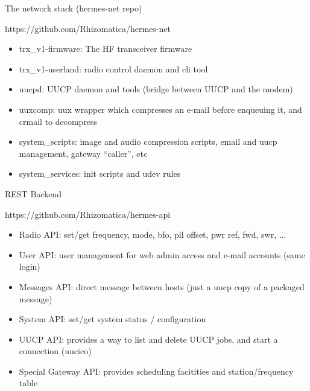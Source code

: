 \documentclass[aspectratio=169,xcolor={x11names,svgnames,dvipsnames}]{beamer}
\begin{document}
\begin{frame}{The network stack (hermes-net repo)}

\begin{block}{https://github.com/Rhizomatica/hermes-net}
    \begin{itemize}
    \item trx\_v1-firmware: The HF transceiver firmware
    \item trx\_v1-userland: radio control daemon and cli tool
    \item uucpd: UUCP daemon and tools (bridge between UUCP and the modem)
    \item uuxcomp: uux wrapper which compresses an e-mail before enqueuing it, and crmail to decompress
    \item system\_scripts: image and audio compression scripts, email and uucp management, gateway ``caller'', etc
    \item system\_services: init scripts and udev rules
    \end{itemize}
  \end{block}

\end{frame}


\begin{frame}{REST Backend}

\begin{block}{https://github.com/Rhizomatica/hermes-api}
    \begin{itemize}
    \item Radio API: set/get frequency, mode, bfo, pll offset, pwr ref, fwd, swr, ...
    \item User API: user management for web admin access and e-mail accounts (same login)
    \item Messages API: direct message between hosts (just a uucp copy of a packaged message)
    \item System API: set/get system status / configuration
    \item UUCP API: provides a way to list and delete UUCP jobs, and start a connection (uucico)
    \item Special Gateway API: provides scheduling facitities and station/frequency table
    \end{itemize}
  \end{block}

\end{frame}
\end{document}
